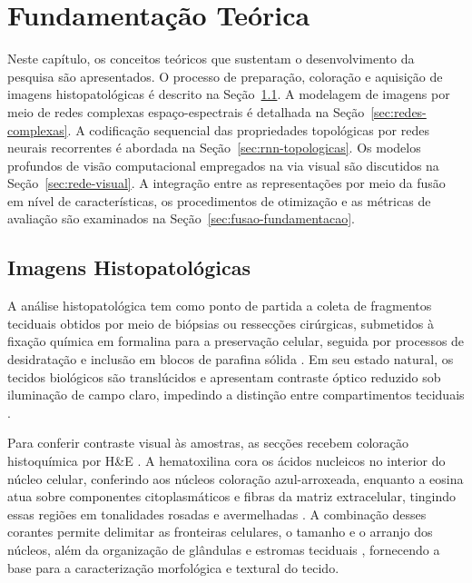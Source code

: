 \chapter{Fundamentação Teórica}

Neste capítulo, os conceitos teóricos que sustentam o desenvolvimento da pesquisa são apresentados. O processo de preparação, coloração e aquisição de imagens histopatológicas é descrito na Seção~\ref{sec:imagens-histopatologicas}. A modelagem de imagens por meio de redes complexas espaço-espectrais é detalhada na Seção~\ref{sec:redes-complexas}. A codificação sequencial das propriedades topológicas por redes neurais recorrentes é abordada na Seção~\ref{sec:rnn-topologicas}. Os modelos profundos de visão computacional empregados na via visual são discutidos na Seção~\ref{sec:rede-visual}. A integração entre as representações por meio da fusão em nível de características, os procedimentos de otimização e as métricas de avaliação são examinados na Seção~\ref{sec:fusao-fundamentacao}.

\section{Imagens Histopatológicas}
\label{sec:imagens-histopatologicas}

A análise histopatológica tem como ponto de partida a coleta de fragmentos teciduais obtidos por meio de biópsias ou ressecções cirúrgicas, submetidos à fixação química em formalina para a preservação celular, seguida por processos de desidratação e inclusão em blocos de parafina sólida \cite{feldman2014tissue,srinidhi2021deep}. Em seu estado natural, os tecidos biológicos são translúcidos e apresentam contraste óptico reduzido sob iluminação de campo claro, impedindo a distinção entre compartimentos teciduais \cite{fischer2008hematoxylin,srinidhi2021deep}.

Para conferir contraste visual às amostras, as secções recebem coloração histoquímica por H\&E \cite{fischer2008hematoxylin,srinidhi2021deep}. A hematoxilina cora os ácidos nucleicos no interior do núcleo celular, conferindo aos núcleos coloração azul-arroxeada, enquanto a eosina atua sobre componentes citoplasmáticos e fibras da matriz extracelular, tingindo essas regiões em tonalidades rosadas e avermelhadas \cite{feldman2014tissue,histImgColorectal}. A combinação desses corantes permite delimitar as fronteiras celulares, o tamanho e o arranjo dos núcleos, além da organização de glândulas e estromas teciduais \cite{srinidhi2021deep,CR}, fornecendo a base para a caracterização morfológica e textural do tecido.

